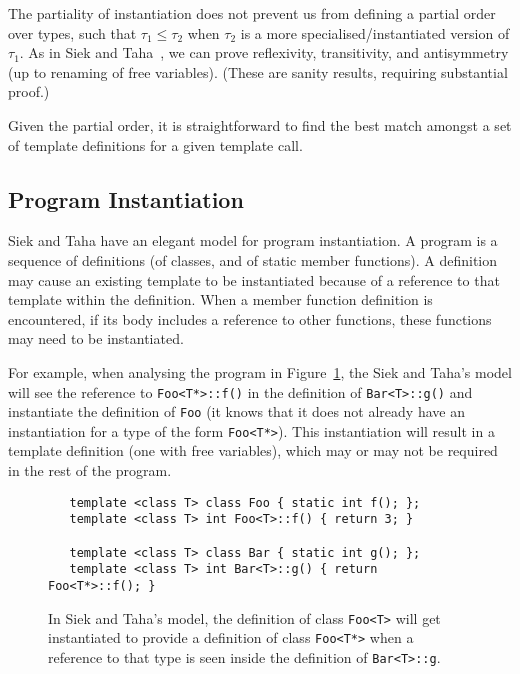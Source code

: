 \documentclass[11pt]{article}
\begin{document}
The partiality of instantiation does not prevent us from defining a
partial order over types, such that $\tau_1 \leq \tau_2$ when $\tau_2$
is a more specialised/instantiated version of $\tau_1$.  As in Siek
and Taha~\cite{DBLP:conf/ecoop/SiekT06}, we can prove reflexivity,
transitivity, and antisymmetry (up to renaming of free variables).
(These are sanity results, requiring substantial proof.)

Given the partial order, it is straightforward to find the best match
amongst a set of template definitions for a given template call.

\subsection{Program Instantiation}

Siek and Taha have an elegant model for program instantiation.  A
program is a sequence of definitions (of classes, and of static member
functions).  A definition may cause an existing template to be
instantiated because of a reference to that template within the
definition.  When a member function definition is encountered, if its
body includes a reference to other functions, these functions may need
to be instantiated.

For example, when analysing the program in Figure~\ref{fig:taha-prog},
the Siek and Taha's model will see the reference to
\texttt{Foo<T*>::f()} in the definition of \texttt{Bar<T>::g()} and
instantiate the definition of \texttt{Foo} (it knows that it does not
already have an instantiation for a type of the form \texttt{Foo<T*>}).
This instantiation will result in a template definition (one with free
variables), which may or may not be required in the rest of the
program.
\begin{figure}
\begin{verbatim}
   template <class T> class Foo { static int f(); };
   template <class T> int Foo<T>::f() { return 3; }

   template <class T> class Bar { static int g(); };
   template <class T> int Bar<T>::g() { return Foo<T*>::f(); }
\end{verbatim}
  \caption[A Template Program]{In Siek and Taha's model, the
    definition of class \texttt{Foo<T>} will get instantiated to
    provide a definition of class \texttt{Foo<T*>} when a reference to
    that type is seen inside the definition of \texttt{Bar<T>::g}.}
\label{fig:taha-prog}
\end{figure}
\end{document}

